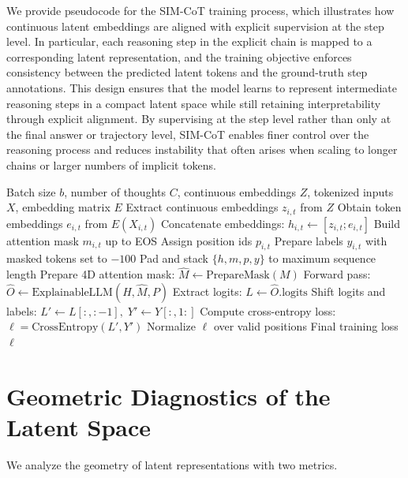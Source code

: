 We provide pseudocode for the SIM-CoT training process, which illustrates how continuous latent embeddings are aligned with explicit supervision at the step level. In particular, each reasoning step in the explicit chain is mapped to a corresponding latent representation, and the training objective enforces consistency between the predicted latent tokens and the ground-truth step annotations. This design ensures that the model learns to represent intermediate reasoning steps in a compact latent space while still retaining interpretability through explicit alignment. By supervising at the step level rather than only at the final answer or trajectory level, SIM-CoT enables finer control over the reasoning process and reduces instability that often arises when scaling to longer chains or larger numbers of implicit tokens.


\begin{algorithm}[h]
\caption{SIM-CoT Training Procedure}
\label{alg:simcot}
\begin{algorithmic}[1]
\Require Batch size $b$, number of thoughts $C$, continuous embeddings $Z$, tokenized inputs $X$, embedding matrix $E$
        \State Extract continuous embeddings $z_{i,t}$ from $Z$
        \State Obtain token embeddings $e_{i,t}$ from $E(X_{i,t})$
        \State Concatenate embeddings: $h_{i,t} \gets [z_{i,t}; e_{i,t}]$
        \State Build attention mask $m_{i,t}$ up to EOS
        \State Assign position ids $p_{i,t}$
        \State Prepare labels $y_{i,t}$ with masked tokens set to $-100$
    \EndFor
\EndFor
\State Pad and stack $\{h,m,p,y\}$ to maximum sequence length
\State Prepare 4D attention mask: $\hat{M} \gets \text{PrepareMask}(M)$
\State Forward pass: $\hat{O} \gets \text{ExplainableLLM}(H, \hat{M}, P)$
\State Extract logits: $L \gets \hat{O}.\text{logits}$
\State Shift logits and labels: $L' \gets L[:, :-1], \; Y' \gets Y[:, 1:]$
\State Compute cross-entropy loss: $\ell = \text{CrossEntropy}(L', Y')$
\State Normalize $\ell$ over valid positions
\Ensure Final training loss $\ell$
\end{algorithmic}
\end{algorithm}

\section{Geometric Diagnostics of the Latent Space}
\label{appendix:geometry}

We analyze the geometry of latent representations with two metrics.

